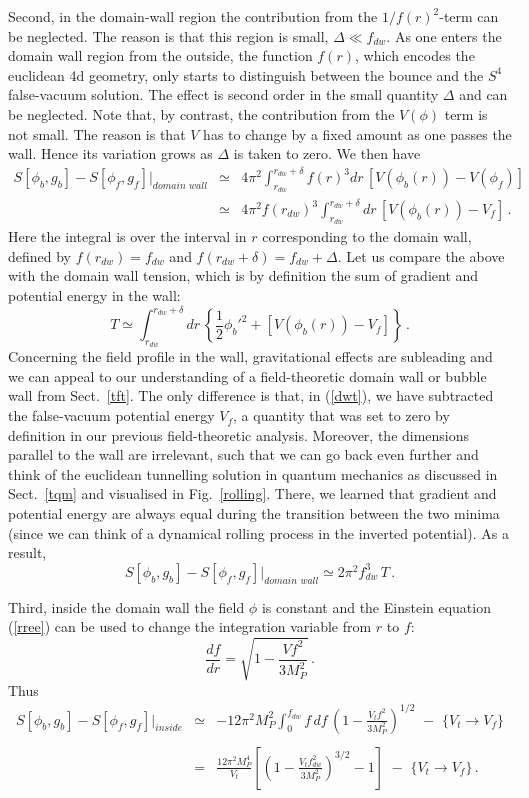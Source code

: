 \documentclass[12pt]{article}
\newcommand{\be}{\begin{equation}}
\newcommand{\ee}{\end{equation}}
\newcommand{\bea}{\begin{eqnarray}}
\newcommand{\eea}{\end{eqnarray}}
\numberwithin{equation}{section}
\begin{document}
Second, in the domain-wall region the contribution from the $1/f(r)^2$-term can be neglected. The reason is that this region is small, $\Delta\ll f_{dw}$. As one enters the domain wall region from the outside, the function $f(r)$, which encodes the euclidean 4d geometry, only starts to distinguish between the bounce and the $S^4$ false-vacuum solution. The effect is second order in the small quantity $\Delta$ and can be neglected. Note that, by contrast, the contribution from the $V(\phi)$ term is not small. The reason is that $V$ has to change by a fixed amount as one passes the wall. Hence its variation grows as $\Delta$ is taken to zero. We then have
\bea
S[\phi_b,g_b]-S[\phi_f,g_f]\Bigg|_{domain\,\,wall} 
&\simeq&
4\pi^2 \int_{r_{dw}}^{r_{dw}+\delta} f(r)^3 dr\,\left[V(\phi_b(r))-V(\phi_f)\right]
\\
&\simeq&
4\pi^2 f(r_{dw})^3 \int_{r_{dw}}^{r_{dw} +\delta} dr\,\left[V(\phi_b(r))-V_f\right]\,.
\eea
Here the integral is over the interval in $r$ corresponding to the domain wall, defined by $f(r_{dw})=f_{dw}$ and $f(r_{dw}+\delta)=f_{dw}+\Delta$. Let us compare the above with the domain wall tension, which is by definition the sum of gradient and potential energy in the wall:
\be
T\simeq \int_{r_{dw}}^{r_{dw}+\delta} dr\,\left\{\frac{1}{2}\phi_b'^2+[V(\phi_b(r))-V_f]\right\}\,.\label{dwt}
\ee
Concerning the field profile in the wall, gravitational effects are subleading and we can appeal to our understanding of a field-theoretic domain wall or bubble wall from Sect.~\ref{tft}. The only difference is that, in (\ref{dwt}), we have subtracted the false-vacuum potential energy $V_f$, a quantity that was set to zero by definition in our previous field-theoretic analysis. Moreover, the dimensions parallel to the wall are irrelevant, such that we can go back even further and think of the euclidean tunnelling solution in quantum mechanics as discussed in Sect.~\ref{tqm} and visualised in Fig.~\ref{rolling}. There, we learned that gradient and potential energy are always equal during the transition between the two minima (since we can think of a dynamical rolling process in the inverted potential). As a result,
\be
S[\phi_b,g_b]-S[\phi_f,g_f]\Bigg|_{domain\,\,wall}\simeq 2\pi^2 f_{dw}^3\, T\,.
\ee

Third, inside the domain wall the field $\phi$ is constant and the Einstein equation (\ref{rree}) can be used to change the integration variable from $r$ to $f$:
\be
\frac{df}{dr}=\sqrt{1-\frac{Vf^2}{3M_P^2}}\,.
\ee
Thus
\bea
S[\phi_b,g_b]-S[\phi_f,g_f]\Bigg|_{inside} &\simeq &
-12\pi^2M_P^2\int_0^{f_{dw}}f\,df\,\left(1-\frac{V_t f^2}{3M_P^2}\right)^{1/2}\,\,-\,\,\Bigg\{ V_t\to V_f\Bigg\}
\nonumber\\
\nonumber\\
&=& \frac{12\pi^2M_P^4}{V_t}\left[\left(1-\frac{V_t f_{dw}^2}{3M_P^2}\right)^{3/2}-1\right] \,\,-\,\,\Bigg\{ V_t\to V_f\Bigg\}\,.
\eea
\end{document}
